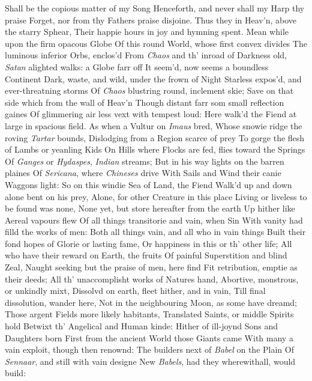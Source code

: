 \documentclass[11pt]{book}
\newcounter {first}
\newcounter {last}
\begin{document}
Shall be the copious matter of my Song 
Henceforth, and never shall my Harp thy praise 
Forget, nor from thy Fathers praise disjoine. 
\quad Thus they in Heav'n, above the starry Sphear, 
Their happie hours in joy and hymning spent. 
Mean while upon the firm opacous Globe 
Of this round World, whose first convex divides 
The luminous inferior Orbs, enclos'd 
From \textit{Chaos} and th' inroad of Darkness old, 
\textit{Satan} alighted walks: a Globe farr off 
It seem'd, now seems a boundless Continent 
Dark, waste, and wild, under the frown of Night 
Starless expos'd, and ever-threatning storms 
Of \textit{Chaos} blustring round, inclement skie; 
Save on that side which from the wall of Heav'n 
Though distant farr som small reflection gaines 
Of glimmering air less vext with tempest loud: 
Here walk'd the Fiend at large in spacious field. 
As when a Vultur on \textit{Imaus} bred, 
Whose snowie ridge the roving \textit{Tartar} bounds, 
Dislodging from a Region scarce of prey 
To gorge the flesh of Lambs or yeanling Kids 
On Hills where Flocks are fed, flies toward the Springs 
Of \textit{Ganges} or \textit{Hydaspes}, \textit{Indian} streams; 
But in his way lights on the barren plaines 
Of \textit{Sericana}, where \textit{Chineses} drive 
With Sails and Wind their canie Waggons light: 
So on this windie Sea of Land, the Fiend 
Walk'd up and down alone bent on his prey, 
Alone, for other Creature in this place 
Living or liveless to be found was none, 
None yet, but store hereafter from the earth 
Up hither like Aereal vapours flew 
Of all things transitorie and vain, when Sin 
With vanity had filld the works of men: 
Both all things vain, and all who in vain things 
Built their fond hopes of Glorie or lasting fame, 
Or happiness in this or th' other life; 
All who have their reward on Earth, the fruits 
Of painful Superstition and blind Zeal, 
Naught seeking but the praise of men, here find 
Fit retribution, emptie as their deeds; 
All th' unaccomplisht works of Natures hand, 
Abortive, monstrous, or unkindly mixt, 
Dissolvd on earth, fleet hither, and in vain, 
Till final dissolution, wander here, 
Not in the neighbouring Moon, as some have dreamd; 
Those argent Fields more likely habitants, 
Translated Saints, or middle Spirits hold 
Betwixt th' Angelical and Human kinde: 
Hither of ill-joynd Sons and Daughters born 
First from the ancient World those Giants came 
With many a vain exploit, though then renownd: 
The builders next of \textit{Babel} on the Plain 
Of \textit{Sennaar}, and still with vain designe 
New \textit{Babels}, had they wherewithall, would build: 
\end{document}
